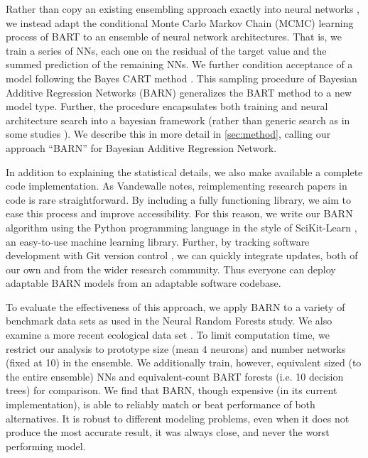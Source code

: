 \documentclass[12pt]{article}
\begin{document}
Rather than copy an existing ensembling approach exactly into neural networks \cite[for example]{biau2019neural}, we instead adapt the conditional Monte Carlo Markov Chain (MCMC) learning process of BART \cite{chipman2010bart} to an ensemble of neural network architectures.  That is, we train a series of NNs, each one on the residual of the target value and the summed prediction of the remaining NNs.  We further condition acceptance of a model following the Bayes CART method \cite{chipman1998bayesian}.  This sampling procedure of Bayesian Additive Regression Networks (BARN) generalizes the BART method to a new model type.  Further, the procedure encapsulates both training and neural architecture search into a bayesian framework (rather than generic search as in some studies \cite{idrissi2016genetic}).  We describe this in more detail in \autoref{sec:method}, calling our approach ``BARN'' for Bayesian Additive Regression Network.

In addition to explaining the statistical details, we also make available a complete code implementation.  As Vandewalle \cite{vandewalle2012code} notes, reimplementing research papers in code is rare straightforward.  By including a fully functioning library, we aim to ease this process and improve accessibility.  For this reason, we write our BARN algorithm using the Python programming language \cite{van1995python} in the style of SciKit-Learn \cite{scikit-learn}, an easy-to-use machine learning library.  Further, by tracking software development with Git version control \cite{chacon2014pro}, we can quickly integrate updates, both of our own and from the wider research community.  Thus everyone can deploy adaptable BARN models from an adaptable software codebase.

To evaluate the effectiveness of this approach, we apply BARN to a variety of benchmark data sets \cite{Dua:2019} as used in the Neural Random Forests \cite{biau2019neural} study.  We also examine a more recent ecological data set \cite{roman2022bayclump}.  To limit computation time, we restrict our analysis to prototype size (mean 4 neurons) and number networks (fixed at 10) in the ensemble.  We additionally train, however, equivalent sized (to the entire ensemble) NNs and equivalent-count BART forests (i.e. 10 decision trees) for comparison.  We find that BARN, though expensive (in its current implementation), is able to reliably match or beat performance of both alternatives.  It is robust to different modeling problems, even when it does not produce the most accurate result, it was always close, and never the worst performing model.
\end{document}
